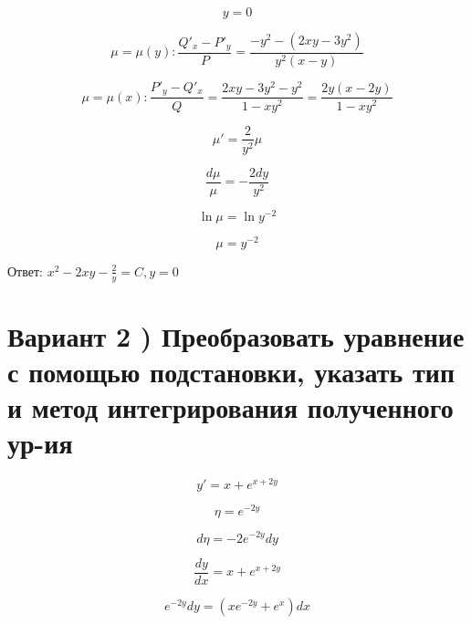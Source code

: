 \documentclass[a4paper]{article}
\begin{document}
\begin{equation*}
y = 0
\end{equation*}

\begin{equation*}
\mu = \mu(y): \frac{Q'_x - P'_y}{P} = \frac{-y^2 - (2xy - 3y^2)}{y^2(x - y)}
\end{equation*}

\begin{equation*}
\mu = \mu(x): \frac{P'_y - Q'_x}{Q} = \frac{2xy - 3y^2 - y^2}{1 - xy^2} = \frac{2y(x - 2y)}{1 - xy^2}
\end{equation*}

\begin{equation*}
\mu' = \frac{2}{y^2}\mu
\end{equation*}

\begin{equation*}
\frac{d\mu}{\mu} = - \frac{2dy}{y^2}
\end{equation*}

\begin{equation*}
\ln{\mu} =
\ln{y^{-2}}
\end{equation*}

\begin{equation*}
\mu = y^{-2}
\end{equation*}

Ответ: $ x^2 - 2xy - \frac{2}{y} = C, y = 0$

\section*{Вариант 2 ) Преобразовать уравнение с помощью подстановки, указать тип и метод интегрирования полученного ур-ия}

\begin{equation*}
y' = x + e^{x + 2y}
\end{equation*}

\begin{equation*}
\eta = e^{-2y}
\end{equation*}

\begin{equation*}
d\eta = -2e^{-2y}dy
\end{equation*}

\begin{equation*}
\frac{dy}{dx} = x + e^{x + 2y}
\end{equation*}

\begin{equation*}
e^{-2y}dy = (xe^{-2y} + e^x)dx
\end{equation*}
\end{document}
